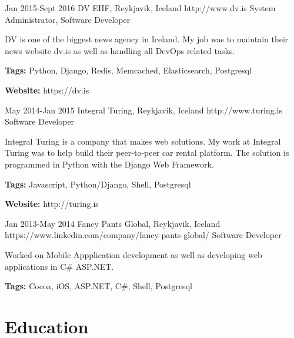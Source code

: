 \documentclass[10pt]{article} %
\begin{document}

\job
{Jan 2015-}{Sept 2016}
{DV EHF, Reykjavik, Iceland}
{http://www.dv.is}
{System Administrator, Software Developer}
{DV is one of the biggest news agency in Iceland. My job was to maintain their news website dv.is as well as handling all DevOps related tasks.\\
\rule{0mm}{5mm}\textbf{Tags:} Python, Django, Redis, Memcached, Elasticsearch, Postgresql\\
\rule{0mm}{5mm}\textbf{Website:} https://dv.is
}


\job
{May 2014-}{Jan 2015}
{Integral Turing, Reykjavik, Iceland}
{http://www.turing.is}
{Software Developer}
{Integral Turing is a company that makes web solutions. My work at Integral Turing was to help build their peer-to-peer car rental platform.
The solution is programmed in Python with the Django Web Framework.\\
\rule{0mm}{5mm}\textbf{Tags:} Javascript, Python/Django, Shell, Postgresql\\
\rule{0mm}{5mm}\textbf{Website:} http://turing.is
}


\job
{Jan 2013-}{May 2014}
{Fancy Pants Global, Reykjavik, Iceland}
{https://www.linkedin.com/company/fancy-pants-global/}
{Software Developer}
{Worked on Mobile Appplication development as well as developing web applications in C\# ASP.NET. \\
\rule{0mm}{5mm}\textbf{Tags:} Cocoa, iOS, ASP.NET, C\#, Shell, Postgresql}


\newpage
\section{Education}


\end{document}
